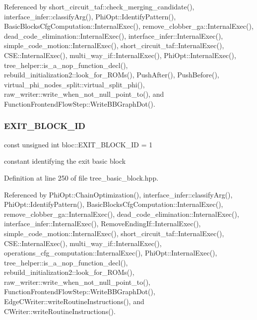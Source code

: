 Referenced by short\+\_\+circuit\+\_\+taf\+::check\+\_\+merging\+\_\+candidate(), interface\+\_\+infer\+::classify\+Arg(), Phi\+Opt\+::\+Identify\+Pattern(), Basic\+Blocks\+Cfg\+Computation\+::\+Internal\+Exec(), remove\+\_\+clobber\+\_\+ga\+::\+Internal\+Exec(), dead\+\_\+code\+\_\+elimination\+::\+Internal\+Exec(), interface\+\_\+infer\+::\+Internal\+Exec(), simple\+\_\+code\+\_\+motion\+::\+Internal\+Exec(), short\+\_\+circuit\+\_\+taf\+::\+Internal\+Exec(), C\+S\+E\+::\+Internal\+Exec(), multi\+\_\+way\+\_\+if\+::\+Internal\+Exec(), Phi\+Opt\+::\+Internal\+Exec(), tree\+\_\+helper\+::is\+\_\+a\+\_\+nop\+\_\+function\+\_\+decl(), rebuild\+\_\+initialization2\+::look\+\_\+for\+\_\+\+R\+O\+Ms(), Push\+After(), Push\+Before(), virtual\+\_\+phi\+\_\+nodes\+\_\+split\+::virtual\+\_\+split\+\_\+phi(), raw\+\_\+writer\+::write\+\_\+when\+\_\+not\+\_\+null\+\_\+point\+\_\+to(), and Function\+Frontend\+Flow\+Step\+::\+Write\+B\+B\+Graph\+Dot().

\mbox{\label{structbloc_a5e5f687ad1bd5bfaf6e1ba9774e1cdd3}} 
\subsubsection{\texorpdfstring{E\+X\+I\+T\+\_\+\+B\+L\+O\+C\+K\+\_\+\+ID}{EXIT\_BLOCK\_ID}}
{\footnotesize\ttfamily const unsigned int bloc\+::\+E\+X\+I\+T\+\_\+\+B\+L\+O\+C\+K\+\_\+\+ID = 1\hspace{0.3cm}{\ttfamily [static]}}



constant identifying the exit basic block 



Definition at line 250 of file tree\+\_\+basic\+\_\+block.\+hpp.



Referenced by Phi\+Opt\+::\+Chain\+Optimization(), interface\+\_\+infer\+::classify\+Arg(), Phi\+Opt\+::\+Identify\+Pattern(), Basic\+Blocks\+Cfg\+Computation\+::\+Internal\+Exec(), remove\+\_\+clobber\+\_\+ga\+::\+Internal\+Exec(), dead\+\_\+code\+\_\+elimination\+::\+Internal\+Exec(), interface\+\_\+infer\+::\+Internal\+Exec(), Remove\+Ending\+If\+::\+Internal\+Exec(), simple\+\_\+code\+\_\+motion\+::\+Internal\+Exec(), short\+\_\+circuit\+\_\+taf\+::\+Internal\+Exec(), C\+S\+E\+::\+Internal\+Exec(), multi\+\_\+way\+\_\+if\+::\+Internal\+Exec(), operations\+\_\+cfg\+\_\+computation\+::\+Internal\+Exec(), Phi\+Opt\+::\+Internal\+Exec(), tree\+\_\+helper\+::is\+\_\+a\+\_\+nop\+\_\+function\+\_\+decl(), rebuild\+\_\+initialization2\+::look\+\_\+for\+\_\+\+R\+O\+Ms(), raw\+\_\+writer\+::write\+\_\+when\+\_\+not\+\_\+null\+\_\+point\+\_\+to(), Function\+Frontend\+Flow\+Step\+::\+Write\+B\+B\+Graph\+Dot(), Edge\+C\+Writer\+::write\+Routine\+Instructions(), and C\+Writer\+::write\+Routine\+Instructions().

